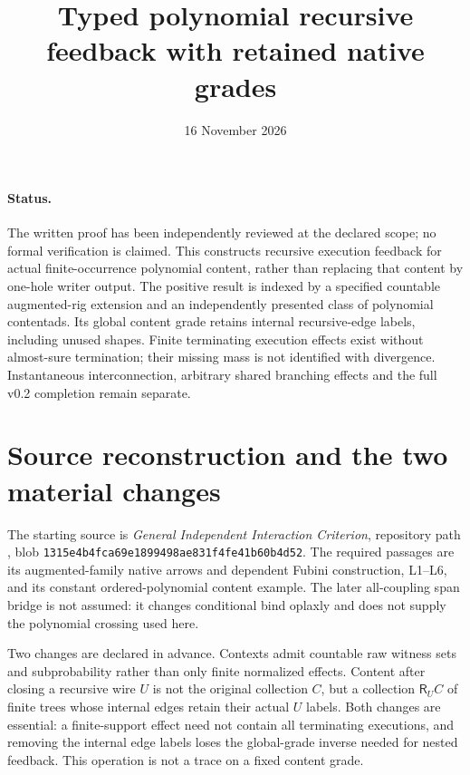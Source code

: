 \documentclass[11pt]{article}
\title{Typed polynomial recursive feedback with retained native grades}
\date{16 November 2026}
\newcommand{\R}{\mathsf R}\newcommand{\Col}{\mathsf{Col}}\newcommand{\Vect}{\mathbf{Vect}_k}
\begin{document}
\maketitle
\paragraph{Status.} The written proof has been independently reviewed at the declared scope; no formal verification is claimed. This constructs recursive execution feedback for actual finite-occurrence polynomial content, rather than replacing that content by one-hole writer output. The positive result is indexed by a specified countable augmented-rig extension and an independently presented class of polynomial contentads. Its global content grade retains internal recursive-edge labels, including unused shapes. Finite terminating execution effects exist without almost-sure termination; their missing mass is not identified with divergence. Instantaneous interconnection, arbitrary shared branching effects and the full v0.2 completion remain separate.

\section{Source reconstruction and the two material changes}
The starting source is \emph{General Independent Interaction Criterion}, repository path
, blob
\texttt{1315e4b4fca69e1899498ae831f4fe41b60b4d52}.
The required passages are its augmented-family native arrows and dependent Fubini construction, L1--L6, and its constant ordered-polynomial content example. The later all-coupling span bridge is not assumed: it changes conditional bind oplaxly and does not supply the polynomial crossing used here.

Two changes are declared in advance. Contexts admit countable raw witness sets and subprobability rather than only finite normalized effects. Content after closing a recursive wire $U$ is not the original collection $C$, but a collection $\R_U C$ of finite trees whose internal edges retain their actual $U$ labels. Both changes are essential: a finite-support effect need not contain all terminating executions, and removing the internal edge labels loses the global-grade inverse needed for nested feedback. This operation is not a trace on a fixed content grade.
\end{document}
